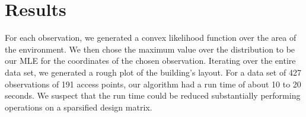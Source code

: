 \section{Results}
For each observation, we generated a convex likelihood function over
the area of the environment. We then chose the maximum value over the
distribution to be our MLE for the coordinates of the chosen
observation. Iterating over the entire data set, we generated a rough
plot of the building's layout.
For a data set of 427 observations of 191 access points, our algorithm
had a run time of about 10 to 20 seconds. We suspect that the run time
could be reduced substantially performing operations on a sparsified
design matrix.
